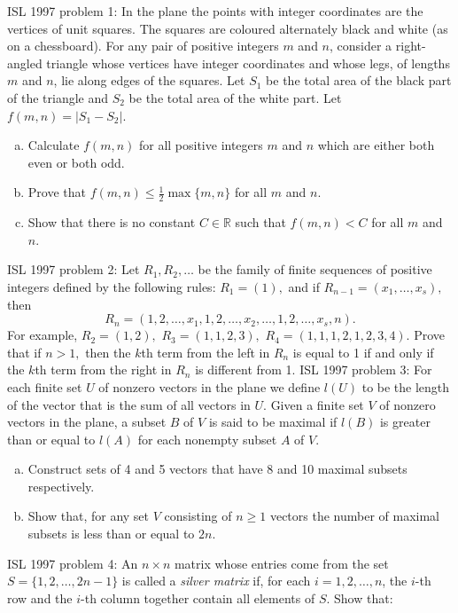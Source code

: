 ISL 1997 problem 1:  In the plane the points with integer coordinates are the vertices of unit squares. The squares are coloured alternately black and white (as on a chessboard). For any pair of positive integers $ m$ and $ n$, consider a right-angled triangle whose vertices have integer coordinates and whose legs, of lengths $ m$ and $ n$, lie along edges of the squares. Let $ S_1$ be the total area of the black part of the triangle and $ S_2$ be the total area of the white part. Let $ f(m,n) = | S_1 - S_2 |$.
\begin{enumerate}[a)]
  \item Calculate $ f(m,n)$ for all positive integers $ m$ and $ n$ which are either both even or both odd.
  \item Prove that $ f(m,n) \leq \frac 12 \max \{m,n \}$ for all $ m$ and $ n$.
  \item Show that there is no constant $ C\in\mathbb{R}$ such that $ f(m,n) < C$ for all $ m$ and $ n$.
\end{enumerate} 
ISL 1997 problem 2:  Let $ R_1,R_2, \ldots$ be the family of finite sequences of positive integers defined by the following rules:  $ R_1 = (1),$ and if $ R_{n - 1} = (x_1, \ldots, x_s),$ then
\[ R_n = (1, 2, \ldots, x_1, 1, 2, \ldots, x_2, \ldots, 1, 2, \ldots, x_s, n). \]
For example, $ R_2 = (1, 2),$ $ R_3 = (1, 1, 2, 3),$ $ R_4 = (1, 1, 1, 2, 1, 2, 3, 4).$ Prove that if $ n > 1,$ then the $ k$th term from the left in $ R_n$ is equal to 1 if and only if the $ k$th term from the right in $ R_n$ is different from 1. 
ISL 1997 problem 3:  For each finite set $ U$ of nonzero vectors in the plane we define $ l(U)$ to be the length of the vector that is the sum of all vectors in $ U.$ Given a finite set $ V$ of nonzero vectors in the plane, a subset $ B$ of $ V$ is said to be maximal if $ l(B)$ is greater than or equal to $ l(A)$ for each nonempty subset $ A$ of $ V.$
\begin{enumerate}[(a)]
  \item Construct sets of 4 and 5 vectors that have 8 and 10 maximal subsets respectively.
  \item Show that, for any set $ V$ consisting of $ n \geq 1$ vectors the number of maximal subsets is less than or equal to $ 2n.$
\end{enumerate} 
ISL 1997 problem 4:  An $ n \times n$ matrix whose entries come from the set $ S = \{1, 2, \ldots , 2n - 1\}$ is called a \textit{silver matrix} if, for each $ i = 1, 2, \ldots , n$, the $ i$-th row and the $ i$-th column together contain all elements of $ S$. Show that:
